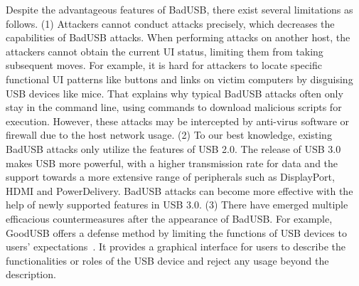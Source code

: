 Despite the advantageous features of BadUSB, there exist several limitations as
follows.  (1) Attackers cannot conduct attacks precisely, which decreases the
capabilities of BadUSB attacks.  When performing attacks on another host, the
attackers cannot obtain the current \ac{UI} status, limiting
them from taking subsequent moves.  For example, it is hard for attackers to
locate specific functional \ac{UI} patterns like buttons and links on victim
computers by disguising \ac{USB} devices like mice.  That explains why typical
BadUSB attacks often only stay in the command line, using commands to download
malicious scripts for execution.  However, these attacks may be intercepted by
anti-virus software or firewall due to the host network usage.  (2) To
our best knowledge, existing BadUSB attacks only utilize the features of \ac{USB}
2.0.  The release of \ac{USB} 3.0 makes \ac{USB} more powerful, with a higher
transmission rate for data and the support towards a more extensive range of
peripherals such as DisplayPort, HDMI and PowerDelivery.  BadUSB attacks
can become more effective with the help of newly supported features in \ac{USB} 3.0.
(3) There have emerged multiple efficacious countermeasures after the
appearance of BadUSB.  For example, GoodUSB offers a defense method by limiting
the functions of \ac{USB} devices to users' expectations~\cite{tian2015defending}.
It provides a graphical interface for users to describe the functionalities or
roles of the \ac{USB} device and reject any usage beyond the description.

